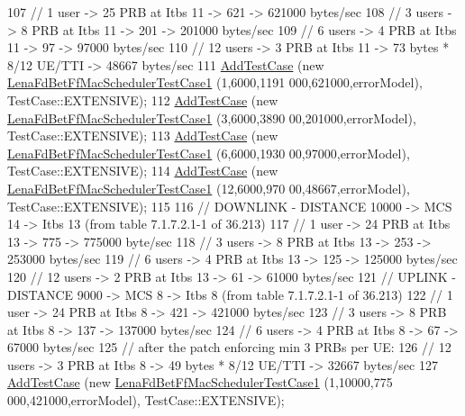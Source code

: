 \begin{DoxyCode}
107   \textcolor{comment}{// 1 user -> 25 PRB at Itbs 11 -> 621 -> 621000 bytes/sec}
108   \textcolor{comment}{// 3 users -> 8 PRB at Itbs 11 -> 201 -> 201000 bytes/sec}
109   \textcolor{comment}{// 6 users -> 4 PRB at Itbs 11 -> 97 -> 97000 bytes/sec}
110   \textcolor{comment}{// 12 users -> 3 PRB at Itbs 11 -> 73 bytes * 8/12 UE/TTI -> 48667 bytes/sec}
111   \hyperlink{classns3_1_1TestCase_a3718088e3eefd5d6454569d2e0ddd835}{AddTestCase} (\textcolor{keyword}{new} \hyperlink{classLenaFdBetFfMacSchedulerTestCase1}{LenaFdBetFfMacSchedulerTestCase1} (1,6000,1191
      000,621000,errorModel), TestCase::EXTENSIVE);
112   \hyperlink{classns3_1_1TestCase_a3718088e3eefd5d6454569d2e0ddd835}{AddTestCase} (\textcolor{keyword}{new} \hyperlink{classLenaFdBetFfMacSchedulerTestCase1}{LenaFdBetFfMacSchedulerTestCase1} (3,6000,3890
      00,201000,errorModel), TestCase::EXTENSIVE);
113   \hyperlink{classns3_1_1TestCase_a3718088e3eefd5d6454569d2e0ddd835}{AddTestCase} (\textcolor{keyword}{new} \hyperlink{classLenaFdBetFfMacSchedulerTestCase1}{LenaFdBetFfMacSchedulerTestCase1} (6,6000,1930
      00,97000,errorModel), TestCase::EXTENSIVE);
114   \hyperlink{classns3_1_1TestCase_a3718088e3eefd5d6454569d2e0ddd835}{AddTestCase} (\textcolor{keyword}{new} \hyperlink{classLenaFdBetFfMacSchedulerTestCase1}{LenaFdBetFfMacSchedulerTestCase1} (12,6000,970
      00,48667,errorModel), TestCase::EXTENSIVE);
115 
116   \textcolor{comment}{// DOWNLINK - DISTANCE 10000 -> MCS 14 -> Itbs 13 (from table 7.1.7.2.1-1 of 36.213)}
117   \textcolor{comment}{// 1 user -> 24 PRB at Itbs 13 -> 775 -> 775000 byte/sec}
118   \textcolor{comment}{// 3 users -> 8 PRB at Itbs 13 -> 253 -> 253000 bytes/sec}
119   \textcolor{comment}{// 6 users -> 4 PRB at Itbs 13 -> 125 -> 125000 bytes/sec}
120   \textcolor{comment}{// 12 users -> 2 PRB at Itbs 13 -> 61 -> 61000 bytes/sec}
121   \textcolor{comment}{// UPLINK - DISTANCE 9000 -> MCS 8 -> Itbs 8 (from table 7.1.7.2.1-1 of 36.213)}
122   \textcolor{comment}{// 1 user -> 24 PRB at Itbs 8 -> 421 -> 421000 bytes/sec}
123   \textcolor{comment}{// 3 users -> 8 PRB at Itbs 8 -> 137 -> 137000 bytes/sec}
124   \textcolor{comment}{// 6 users -> 4 PRB at Itbs 8 -> 67 -> 67000 bytes/sec}
125   \textcolor{comment}{// after the patch enforcing min 3 PRBs per UE:}
126   \textcolor{comment}{// 12 users -> 3 PRB at Itbs 8 -> 49 bytes * 8/12 UE/TTI -> 32667 bytes/sec}
127   \hyperlink{classns3_1_1TestCase_a3718088e3eefd5d6454569d2e0ddd835}{AddTestCase} (\textcolor{keyword}{new} \hyperlink{classLenaFdBetFfMacSchedulerTestCase1}{LenaFdBetFfMacSchedulerTestCase1} (1,10000,775
      000,421000,errorModel), TestCase::EXTENSIVE);

\end{DoxyCode}
